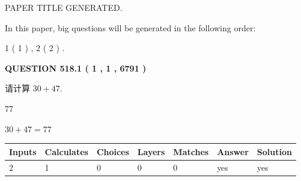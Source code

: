 \documentclass{ctexart}
\begin{document}
   
\vspace{0.2in}
   
   
   
   
   
   
   
   
 \vspace{0.2in}
 
 
 
 
   
   
 PAPER TITLE GENERATED.
   
   
   
\vspace{0.2in}
   
In this paper, big questions will be generated in the following order: 
   
   
   1 ( 1 )
 ,
   2 ( 2 )
 .
  
\vspace{0.2in}
  
{\textbf{\Large{QUESTION
518.1 
 ( 1 , 1 , 6791 )
}}}
  
  
 
请计算 $ %
30 +  %
47 $.
 
 
 
\noindent{}
 
 

77
 
 
\noindent{}
 
 

 
 
 
\noindent{}
 
 

$ %
30 +  %
47=   %
77$
 
 
\noindent{}
 
 

 
   
   
   
   
\noindent\begin{tabular}{|l|l|l|l|l|l|l|}
 \hline
Inputs & Calculates & Choices & Layers & Matches & Answer & Solution \\ \hline
 2  & 
 1  & 
 0
  & 
 0  & 
 0  & 
  yes & 
  yes 
  \\ \hline
 \end{tabular}
   
\end{document}
